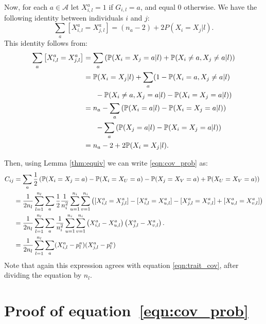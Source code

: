 Now, for each $a \in \mathcal{A}$ let $X^a_{i,l} = 1$ if $G_{i,l} = a$,
and equal 0 otherwise.
%
We have the following identity between individuals $i$ and $j$:
%
\[ \sum_a [X^a_{i,l} = X^a_{j,l}] = \left(n_a - 2\right) + 2 P\left(X_i = X_j|l\right). \]
%
This identity follows from:
%
$$
\begin{aligned}
\sum_a \left[X^a_{i,l} = X^a_{j,l}\right]
    &= \sum_a \left(\P(X_i = X_j = a|l) + \P(X_i \neq a, X_j \neq a|l) \right) \\
    &= \P(X_i = X_j|l) + \sum_a ( 1 - \P(X_i = a, X_j \neq a|l) \\ 
    &~~~~~ - \P(X_i \neq a, X_j = a|l) - \P(X_i = X_j = a|l) ) \\
    &= n_a - \sum_a \left( \P(X_i = a|l) - \P(X_i = X_j = a|l) \right) \\ 
    &~~~~~ - \sum_a \left( \P(X_j = a|l) - \P(X_i = X_j = a|l) \right) \\
    &= n_a - 2 + 2\P(X_i = X_j|l).
\end{aligned}
$$

Then, using Lemma \ref{thm:equiv} we can write \eqref{eqn:cov_prob} as:
%
$$
\begin{aligned}
C_{ij} 
    &=
    \sum_a \frac{1}{2}\left(\P(X_i = X_j = a) - \P(X_i = X_U = a) - \P(X_j = X_V = a) + \P(X_U = X_V = a) \right) \\
    &= \frac{1}{2n_l} \sum_{l=1}^{n_l} \sum_a
        \frac{1}{2}\frac{1}{n_i^2} \sum_{u=1}^{n_i} \sum_{v=1}^{n_i}
         \left( [X^a_{i,l} = X^a_{j,l}] - [X^a_{i,l} = X^a_{u,l}] - 
         [X^a_{j,l} = X^a_{v,l}] + [X^a_{u,l} = X^a_{v,l}] \right) \\
    &= \frac{1}{2n_l} \sum_{l=1}^{n_l} \sum_a
        \frac{1}{n_i^2} \sum_{u=1}^{n_i} \sum_{v=1}^{n_i}
         \left(X^a_{i,l} - X^a_{u,l}\right)
         \left(X^a_{j,l} - X^a_{v,l}\right). \label{eqn:compute_C} \\
    &= \frac{1}{2n_l} \sum_{l=1}^{n_l} \sum_a (X_{i,l}^a - p_l^a)(X_{j,l}^a - p_l^a)
\end{aligned}
$$
%
Note that again this expression agrees with equation \eqref{eqn:trait_cov},
after dividing the equation by $n_l$.


\section{Proof of equation~\eqref{eqn:cov_prob}}
\label{apx:proof_equality}

